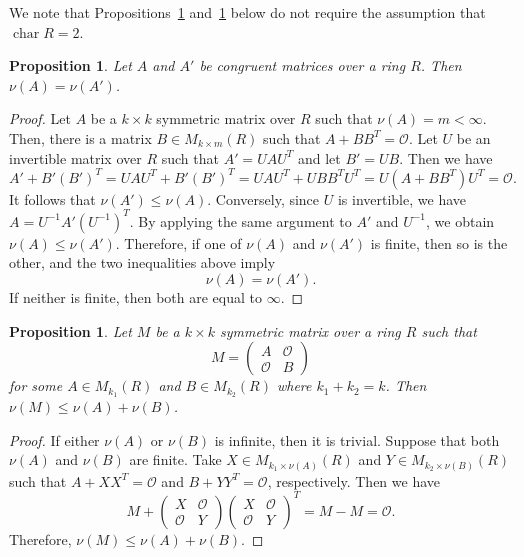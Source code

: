 \documentclass{article}
\newtheorem{proposition}[theorem]{Proposition}
\theoremstyle{definition}
\theoremstyle{remark}
\begin{document}
We note that Propositions~\ref{embed-cong} and~\ref{embed-inequal} below do not require the
assumption that $\operatorname{char}R=2$.

\begin{proposition}\label{embed-cong}
    Let $A$ and $A'$ be congruent matrices over a ring $R$. Then $\nu(A)=\nu(A')$.
\end{proposition}
\begin{proof}
    Let $A$ be a $k\times k$ symmetric matrix over $R$ such that $\nu(A)=m<\infty$. Then, there is a matrix $B\in M_{k\times m}(R)$ such that $A+BB^T=\mathcal{O}$. Let $U$ be an invertible matrix over $R$ such that $A'=UAU^T$ and let $B'=UB$. Then we have
    \[
    A'+B'(B')^T=UAU^T+B'(B')^T=UAU^T+UBB^TU^T=U(A+BB^T)U^T=\mathcal{O}.
    \]
    It follows that $\nu(A')\le \nu(A)$. Conversely, since $U$ is invertible, we have $A=U^{-1}A'(U^{-1})^T$. By applying the same argument to $A'$ and $U^{-1}$, we obtain $\nu(A)\le \nu(A')$.  Therefore, if one of $\nu(A)$ and $\nu(A')$ is finite, then so is the other, and the two inequalities above imply
    \[
    \nu(A)=\nu(A').
    \]
    If neither is finite, then both are equal to $\infty$.

   
\end{proof}

\begin{proposition}\label{embed-inequal}
    Let $M$ be a $k\times k$ symmetric matrix over a ring $R$ such that 
    \[
    M=\begin{pmatrix} A & \mathcal{O}\\\mathcal{O} & B \end{pmatrix}
    \]
    for some $A\in M_{k_1}(R)$ and $B\in M_{k_2}(R)$ where $k_1+k_2=k$. Then $\nu(M)\le \nu(A)+\nu(B)$.
\end{proposition}
\begin{proof}
If either $\nu(A)$ or $\nu(B)$ is infinite, then it is trivial. Suppose that both $\nu(A)$ and $\nu(B)$ are finite. Take $X\in M_{k_1\times \nu(A)}(R)$ and $Y\in M_{k_2\times \nu(B)}(R)$ such that $A+XX^T=\mathcal{O}$ and $B+YY^T=\mathcal{O}$, respectively. Then we have \[
    M+\begin{pmatrix} X & \mathcal{O}\\\mathcal{O} & Y \end{pmatrix}\begin{pmatrix} X & \mathcal{O}\\\mathcal{O} & Y \end{pmatrix}^T=M-M=\mathcal{O}.
    \]
    Therefore, $\nu(M)\le \nu(A)+\nu(B)$.
\end{proof}
\end{document}
